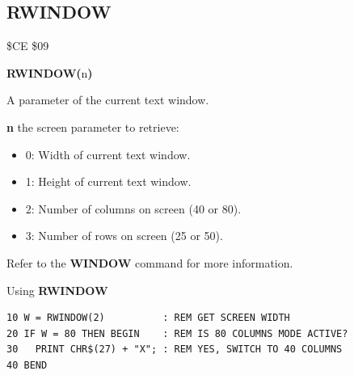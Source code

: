 
\newpage
\subsection{RWINDOW}
\begin{description}[leftmargin=2cm,style=nextline]
\item [Token:]    \$CE \$09

\item [Format:]   {\bf RWINDOW(}n{\bf)}

\item [Returns:]  A parameter of the current text window.

                  {\bf n} the screen parameter to retrieve:

                  \begin{itemize}
                     \item 0: Width of current text window.
                     \item 1: Height of current text window.
                     \item 2: Number of columns on screen (40 or 80).
                     \item 3: Number of rows on screen (25 or 50).
                  \end{itemize}

\item [Remarks:]  Refer to the {\bf WINDOW} command for more information.

\item [Example:]  Using {\bf RWINDOW}

\begin{tcolorbox}[colback=black,coltext=white]
\verbatimfont{\codefont}
\begin{verbatim}
10 W = RWINDOW(2)          : REM GET SCREEN WIDTH
20 IF W = 80 THEN BEGIN    : REM IS 80 COLUMNS MODE ACTIVE?
30   PRINT CHR$(27) + "X"; : REM YES, SWITCH TO 40 COLUMNS
40 BEND
\end{verbatim}
\end{tcolorbox}
\end{description}


\newpage
